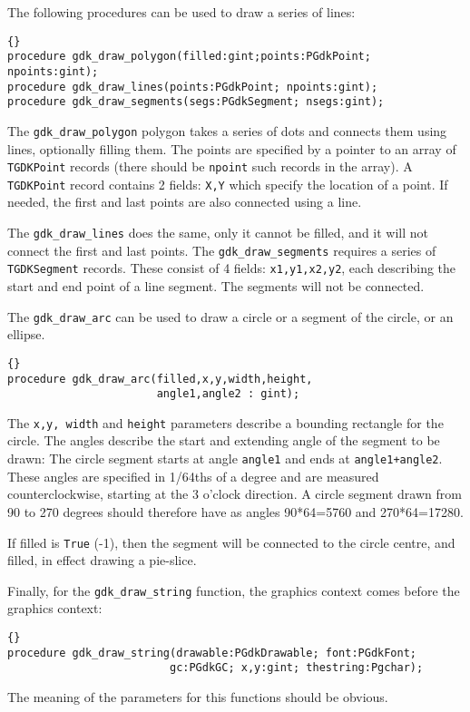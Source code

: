 \documentclass[10pt]{article}
\newcommand{\var}[1]{\texttt{#1}}
\begin{document}
The following procedures can be used to draw a series of lines:
\begin{lstlisting}{}
procedure gdk_draw_polygon(filled:gint;points:PGdkPoint; npoints:gint);
procedure gdk_draw_lines(points:PGdkPoint; npoints:gint);
procedure gdk_draw_segments(segs:PGdkSegment; nsegs:gint);
\end{lstlisting}{}
The \var{gdk\_draw\_polygon} polygon takes a series of dots and connects 
them using lines, optionally filling them. The points are specified by a
pointer to an array of \var{TGDKPoint} records (there should be \var{npoint}
such records in the array). 
A \var{TGDKPoint} record contains 2 fields: \var{X,Y} which specify the 
location of a point. 
If needed, the first and last points are also connected using a line.

The \var{gdk\_draw\_lines} does the same, only it cannot be filled, and it 
will not connect the first and last points.
The \var{gdk\_draw\_segments} requires a series of \var{TGDKSegment}
records. These consist of 4 fields: \var{x1,y1,x2,y2}, each describing
the start and end point of a line segment. The segments will not be
connected.

The \var{gdk\_draw\_arc} can be used to draw a circle or a segment of
the circle, or an ellipse.
\begin{lstlisting}{}
procedure gdk_draw_arc(filled,x,y,width,height,
                       angle1,angle2 : gint);
\end{lstlisting}{}
The \var{x,y, width} and \var{height} parameters describe a bounding
rectangle for the circle. The angles describe the start and extending 
angle of the segment to be drawn: The circle segment starts at angle
\var{angle1} and ends at \var{angle1+angle2}. These angles are specified 
in 1/64ths of a degree and are measured counterclockwise, starting at 
the 3 o'clock direction. A circle segment drawn from 90 to 270 degrees 
should therefore have as angles 90*64=5760 and 270*64=17280.

If filled is \var{True} (-1), then the segment will be connected to
the circle centre, and filled, in effect drawing a pie-slice.

Finally, for the \var{gdk\_draw\_string} function, the graphics context comes
before the graphics context:
\begin{lstlisting}{}
procedure gdk_draw_string(drawable:PGdkDrawable; font:PGdkFont; 
                         gc:PGdkGC; x,y:gint; thestring:Pgchar);
\end{lstlisting}{}
The meaning of the parameters for this functions should be obvious.
\end{document}
